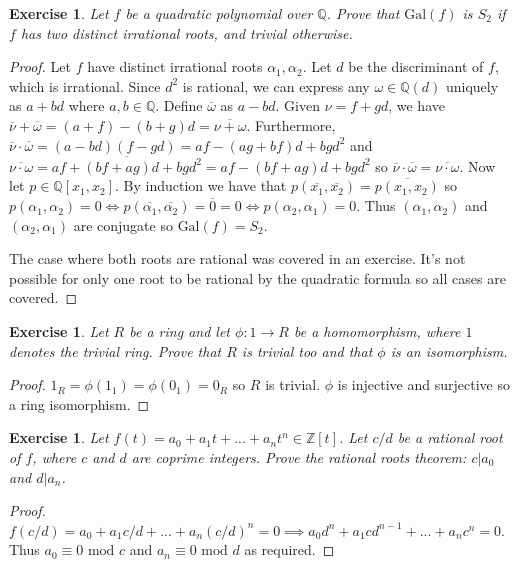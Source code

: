 \documentclass{article}
\newtheorem{exercise}[theorem]{Exercise}
\begin{document}
\begin{exercise}
Let $f$ be a quadratic polynomial over $\mathbb{Q}$. Prove that $\text{Gal}(f)$ is $S_2$ if $f$ has two distinct irrational roots, and trivial otherwise.
\end{exercise}
\begin{proof}
Let $f$ have distinct irrational roots $\alpha_1,\alpha_2$. Let $d$ be the discriminant of $f$, which is irrational. Since $d^2$ is rational, we can express any $\omega\in\mathbb{Q}(d)$ uniquely as $a+bd$ where $a,b\in\mathbb{Q}$. Define $\overline{\omega}$ as $a-bd$. Given $\nu=f+gd$, we have $\overline{\nu}+\overline{\omega}=(a+f)-(b+g)d=\overline{\nu+\omega}$. Furthermore, $\overline{\nu}\cdot\overline{\omega}=(a-bd)(f-gd)=af-(ag+bf)d+bgd^2$ and $\overline{\nu\cdot\omega}=\overline{af+(bf+ag)d+bgd^2}=af-(bf+ag)d+bgd^2$ so $\overline{\nu}\cdot\overline{\omega}=\overline{\nu\cdot\omega}$. Now let $p\in\mathbb{Q}[x_1,x_2]$. By induction we have that $p(\overline{x_1},\overline{x_2})=\overline{p(x_1,x_2)}$ so $p(\alpha_1,\alpha_2)=0\iff p(\overline{\alpha_1},\overline{\alpha_2})=\overline{0}=0\iff p(\alpha_2,\alpha_1)=0$. Thus $(\alpha_1,\alpha_2)$ and $(\alpha_2,\alpha_1)$ are conjugate so $\text{Gal}(f)=S_2$.

The case where both roots are rational was covered in an exercise. It's not possible for only one root to be rational by the quadratic formula so all cases are covered.
\end{proof}

\begin{exercise}
Let $R$ be a ring and let $\phi\colon1\to R$ be a homomorphism, where $1$ denotes the trivial ring. Prove that $R$ is trivial too and that $\phi$ is an isomorphism.
\end{exercise}
\begin{proof}
$1_R=\phi(1_1)=\phi(0_1)=0_R$ so $R$ is trivial. $\phi$ is injective and surjective so a ring isomorphism.
\end{proof}

\begin{exercise}
Let $f(t)=a_0+a_1t+...+a_nt^n\in\mathbb{Z}[t]$. Let $c/d$ be a rational root of $f$, where $c$ and $d$ are coprime integers. Prove the rational roots theorem: $c|a_0$ and $d|a_n$.
\end{exercise}
\begin{proof}
$f(c/d)=a_0+a_1c/d+...+a_n(c/d)^n=0\implies a_0d^n+a_1cd^{n-1}+...+a_nc^n=0$. Thus $a_0\equiv0\text{ mod }c$ and $a_n\equiv0\text{ mod }d$ as required.
\end{proof}
\end{document}
